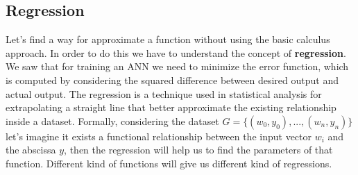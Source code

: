 \documentclass{article}
\begin{document}
\subsection{Regression}
Let's find a way for approximate a function without using the basic calculus approach. In
order to do this we have to understand the concept of \textbf{regression}.
We saw that for training an ANN we need to minimize the error function, which is computed by
considering the squared difference between desired output and actual output.
\newline\newline
The regression is a technique used in statistical analysis for extrapolating a straight
line that better approximate the existing relationship inside a dataset.
\newline\newline
Formally, considering the dataset $G=\{(w_0,y_0),...,(w_n,y_n)\}$ let's imagine it exists a functional relationship
between the input vector $w_i$ and the abscissa $y$, then the regression will help us to find
the parameters of that function. Different kind of functions will give us different kind of regressions.
\end{document}
